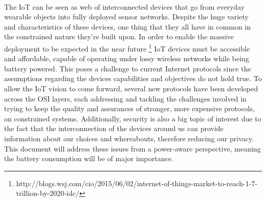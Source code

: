 \paragraph{}The \ac{IoT} can be seen as web of interconnected devices that go from everyday wearable objects into fully deployed sensor networks. Despite the huge variety and characteristics of these devices, one thing that they all have in common in the constrained nature they're built upon. In order to enable the massive deployment to be expected in the near future \footnote{http://blogs.wsj.com/cio/2015/06/02/internet-of-things-market-to-reach-1-7-trillion-by-2020-idc/} \ac{IoT} devices must be accessible and affordable, capable of operating under lossy wireless networks while being battery powered. This poses a challenge to current Internet protocols since the assumptions regarding the devices capabilities and objectives do not hold true. To allow the \ac{IoT} vision to come forward, several new protocols have been developed across the OSI layers, each addressing and tackling the challenges involved in trying to keep the quality and assurances of stronger, more expensive protocols, on constrained systems.
Additionally, security is also a big topic of interest due to the fact that the interconnection of the devices around us can provide information about our choices and whereabouts, therefore reducing our privacy.
This document will address these issues from a power-aware perspective, meaning the battery consumption will be of major importance.
